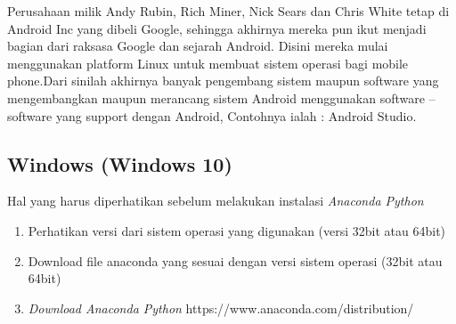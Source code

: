 Perusahaan milik Andy Rubin, Rich Miner, Nick Sears dan Chris White tetap di Android Inc yang dibeli Google, sehingga akhirnya mereka pun ikut  menjadi bagian dari raksasa Google dan sejarah Android. Disini mereka mulai menggunakan platform Linux untuk membuat sistem operasi bagi mobile phone.Dari sinilah akhirnya banyak pengembang sistem maupun software yang mengembangkan maupun merancang sistem Android menggunakan software – software yang support dengan Android, Contohnya ialah : Android Studio.

\subsection{Windows (Windows 10)}
Hal yang harus diperhatikan sebelum melakukan instalasi \textit{Anaconda Python}
\begin{enumerate}
 \item Perhatikan versi dari sistem operasi yang digunakan (versi 32bit atau 64bit)
 \item Download file anaconda yang sesuai dengan versi sistem operasi (32bit atau 64bit)
 \item \textit{Download Anaconda Python} https://www.anaconda.com/distribution/
\end{enumerate}

